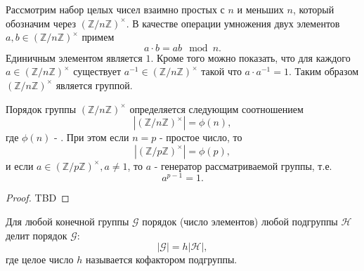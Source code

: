 \begin{definition}
Рассмотрим набор целых чисел взаимно простых с $n$ и меньших $n$,
который обозначим через $\left(\mathbb{Z}/n\mathbb{Z}\right)^\times$. В
качестве операции умножения двух элементов $a,b \in
\left(\mathbb{Z}/n\mathbb{Z}\right)^\times$ примем
\[
a \cdot b = ab \mod n.
\]
Единичным элементом является $1$. Кроме того можно показать, что для
каждого $a \in \left(\mathbb{Z}/n\mathbb{Z}\right)^\times$
существует $a^{-1} \in \left(\mathbb{Z}/n\mathbb{Z}\right)^\times$
такой что $a \cdot a^{-1} = 1$. Таким образом
$\left(\mathbb{Z}/n\mathbb{Z}\right)^\times$ является группой.
\label{def:add:algebra:mult_group}
\end{definition}

\begin{theorem}
Порядок группы $\left(\mathbb{Z}/n\mathbb{Z}\right)^\times$
определяется следующим соотношением
\[
\left|\left(\mathbb{Z}/n\mathbb{Z}\right)^\times\right| = \phi(n),
\]
где $\phi(n)$ - .
При этом если 
$n=p$ - простое число, то
\[
\left|\left(\mathbb{Z}/p\mathbb{Z}\right)^\times\right| = \phi(p),
\]
и если $a \in \left(\mathbb{Z}/p\mathbb{Z}\right)^\times, a \ne 1$,
то $a$ - генератор рассматриваемой группы, т.е.
\[
a^{p-1} = 1.
\]
\begin{proof}
TBD
\end{proof}
\label{thm:add:algebra:cyclic_mult_group}
\end{theorem}

\begin{theorem}[Лагранж]
\label{thm:lagrange}
Для любой конечной группы $\mathcal{G}$ порядок (число элементов)
любой подгруппы $\mathcal{H}$ делит порядок $\mathcal{G}$:
\[
\left|\mathcal{G}\right| = h \left|\mathcal{H}\right|,
\] 
где целое число $h$ называется кофактором подгруппы.
\end{theorem}
